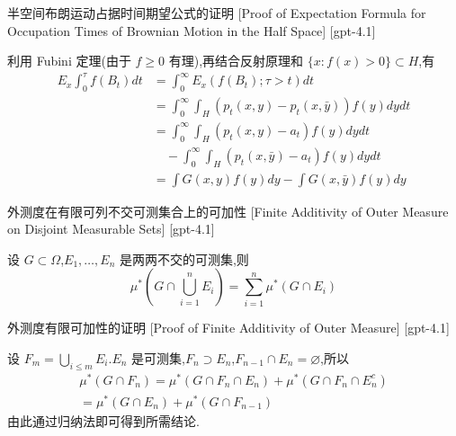 \documentclass[UTF8]{ctexart}
\begin{document}
    
    
    \begin{prf}
        {半空间布朗运动占据时间期望公式的证明}
        [Proof of Expectation Formula for Occupation Times of Brownian Motion in the Half Space]
        [gpt-4.1]
        
利用 Fubini 定理(由于 $f \geq 0$ 有理),再结合反射原理和 $\{x : f(x) > 0\} \subset H$,有
\[
\begin{array}{rl}
E_x \displaystyle\int_0^{\tau} f(B_t) dt &= \displaystyle\int_0^{\infty} E_x(f(B_t); \tau > t) dt \\
&= \displaystyle\int_0^{\infty} \int_H (p_t(x, y) - p_t(x, \bar{y})) f(y) dy dt \\
&= \displaystyle\int_0^{\infty} \int_H (p_t(x, y) - a_t) f(y) dy dt \\
&\quad - \int_0^{\infty} \int_H (p_t(x, \bar{y}) - a_t) f(y) dy dt \\
&= \int G(x, y) f(y) dy - \int G(x, \bar{y}) f(y) dy
\end{array}
\]

    \end{prf}
    
    
    
    \begin{thm}
        {外测度在有限可列不交可测集合上的可加性}
        [Finite Additivity of Outer Measure on Disjoint Measurable Sets]
        [gpt-4.1]
        
设 $G \subset \Omega$,$E_1, \ldots, E_n$ 是两两不交的可测集,则
\[
\mu^*\left( G \cap \bigcup_{i=1}^n E_i \right) = \sum_{i=1}^n \mu^*(G \cap E_i)
\]

    \end{thm}
    
    
    
    \begin{prf}
        {外测度有限可加性的证明}
        [Proof of Finite Additivity of Outer Measure]
        [gpt-4.1]
        
设 $F_m = \bigcup_{i \leq m} E_i$.$E_n$ 是可测集,$F_n \supset E_n$,$F_{n-1} \cap E_n = \varnothing$,所以
\[
\begin{array}{c}
\mu^*(G \cap F_n) = \mu^*(G \cap F_n \cap E_n) + \mu^*(G \cap F_n \cap E_n^c) \\
= \mu^*(G \cap E_n) + \mu^*(G \cap F_{n-1})
\end{array}
\]
由此通过归纳法即可得到所需结论.

    \end{prf}
    
\end{document}

